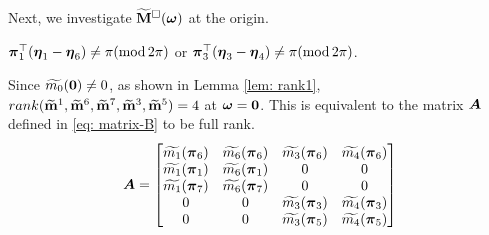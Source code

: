 Next, we investigate $\widetilde{\mathbf{M}}^{\Box}(\boldsymbol{\omega})$ at the origin.
\begin{proposition}\label{prop: origin-det}
$\boldsymbol{\pi}_1^\top(\boldsymbol{\eta}_1-\boldsymbol{\eta}_6)\neq \pi(\text{mod}\,2\pi)$ or $\boldsymbol{\pi}_3^\top(\boldsymbol{\eta}_3-\boldsymbol{\eta}_4)\neq \pi(\text{mod}\,2\pi)$. 
\end{proposition}
 Since $\widetilde{m_0}(\boldsymbol{0})\neq 0$, as shown in Lemma \ref{lem: rank1}, $rank(\widetilde{\mathbf{m}}^{1},\widetilde{\mathbf{m}}^{6},\widetilde{\mathbf{m}}^{7},\widetilde{\mathbf{m}}^{3},\widetilde{\mathbf{m}}^{5})= 4$ at $\boldsymbol{\omega} = \boldsymbol{0}$. This is equivalent to the matrix $\boldsymbol{A}$ defined in \eqref{eq: matrix-B} to be full rank.
\begin{align}\label{eq: matrix-B}
\boldsymbol{A} = 
\begin{bmatrix}
& & & \\[-1em]
\widetilde{m_1}(\boldsymbol{\pi}_6) & \widetilde{m_6}(\boldsymbol{\pi}_6) & \widetilde{m_3}(\boldsymbol{\pi}_6) & \widetilde{m_4}(\boldsymbol{\pi}_6) \\
\widetilde{m_1}(\boldsymbol{\pi}_1) & \widetilde{m_6}(\boldsymbol{\pi}_1) & 0 & 0\\
\widetilde{m_1}(\boldsymbol{\pi}_7) & \widetilde{m_6}(\boldsymbol{\pi}_7) & 0 & 0\\
0 & 0 & \widetilde{m_3}(\boldsymbol{\pi}_3) & \widetilde{m_4}(\boldsymbol{\pi}_3)\\
0 & 0 & \widetilde{m_3}(\boldsymbol{\pi}_5) & \widetilde{m_4}(\boldsymbol{\pi}_5)\\
\end{bmatrix}
\end{align}
